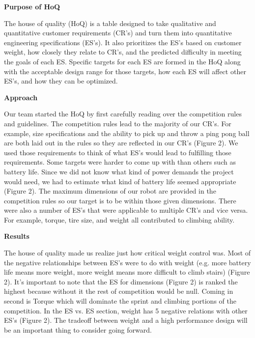 \documentclass[12pt,letterpaper,titlepage]{article}
\begin{document}
\smallskip\noindent\textbf{Purpose of HoQ}

The house of quality (HoQ) is a table designed to take qualitative and quantitative customer requirements (CR's) and turn them into quantitative engineering specifications (ES's). It also prioritizes the ES's based on customer weight, how closely they relate to CR's, and the predicted difficulty in meeting the goals of each ES. Specific targets for each ES are formed in the HoQ along with the acceptable design range for those targets, how each ES will affect other ES's, and how they can be optimized.

\smallskip\noindent\textbf{Approach}

Our team started the HoQ by first carefully reading over the competition rules and guidelines. The competition rules lead to the majority of our CR’s. For example, size specifications and the ability to pick up and throw a ping pong ball are both laid out in the rules so they are reflected in our CR’s (Figure 2). We used those requirements to think of what ES’s would lead to fulfilling those requirements. Some targets were harder to come up with than others such as battery life. Since we did not know what kind of power demands the project would need, we had to estimate what kind of battery life seemed appropriate (Figure 2). The maximum dimensions of our robot are provided in the competition rules so our target is to be within those given dimensions. There were also a number of ES’s that were applicable to multiple CR’s and vice versa. For example, torque, tire size, and weight all contributed to climbing ability.

\smallskip\noindent\textbf{Results}

The house of quality made us realize just how critical weight control was. Most of the negative relationships between ES’s were to do with weight (e.g. more battery life means more weight, more weight means more difficult to climb stairs) (Figure 2). It’s important to note that the ES for dimensions (Figure 2) is ranked the highest because without it the rest of competition would be null. Coming in second is Torque which will dominate the sprint and climbing portions of the competition. In the ES vs. ES section, weight has 5 negative relations with other ES’s (Figure 2). The tradeoff between weight and a high performance design will be an important thing to consider going forward. 
\end{document}
